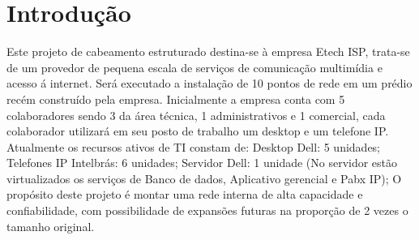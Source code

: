 \documentclass[	DIV=calc,%
							paper=a4,%
							fontsize=12pt,%
							onecolumn]{scrartcl}	 					%
\begin{document}
\renewcommand*\listtablename{Lista de tabelas}
\listoftables




\clearpage
\renewcommand{\contentsname}{Sumário}
\tableofcontents
\clearpage

\section{Introdução}

Este projeto de cabeamento estruturado destina-se à empresa Etech ISP, trata-se de um provedor de pequena escala de serviços de comunicação multimídia e acesso á internet. Será executado a instalação de 10 pontos de rede em um prédio recém construído pela empresa. Inicialmente a empresa conta com 5 colaboradores sendo 3 da área técnica, 1 administrativos e 1 comercial, cada colaborador utilizará em seu posto de trabalho um desktop e um telefone IP. Atualmente os recursos ativos de TI constam de:
Desktop Dell: 5 unidades;
Telefones IP Intelbrás: 6 unidades;
Servidor Dell: 1 unidade (No servidor estão virtualizados os serviços de Banco de dados, Aplicativo gerencial e Pabx IP); 
O propósito deste projeto é montar uma rede interna de alta capacidade e confiabilidade, com possibilidade de expansões futuras na proporção de 2 vezes o tamanho original.
\end{document}
